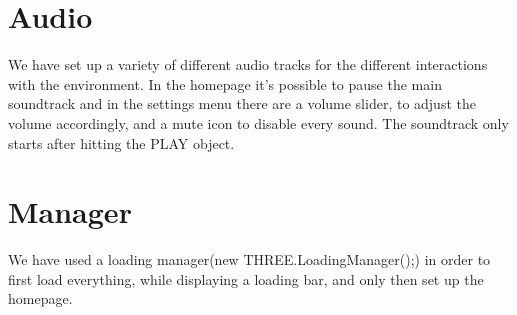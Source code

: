 \documentclass[a4paper,oneside]{report}
\begin{document}
\section{Audio}
We have set up a variety of different audio tracks for the different interactions with the environment.
In the homepage it's possible to pause the main soundtrack and in the settings menu there are a volume slider, to adjust the volume accordingly, and a mute icon to disable every sound. The soundtrack only starts after hitting the PLAY object.

\section{Manager}
We have used a loading manager(new THREE.LoadingManager();) in order to first load everything, while displaying a loading bar, and only then set up the homepage.
\end{document}
